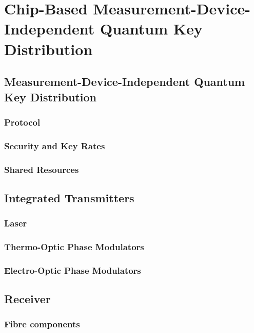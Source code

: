 %
%
\let\textcircled=\pgftextcircled
\chapter{Chip-Based Measurement-Device-Independent Quantum Key Distribution}
\label{chap:mdiqkd}

\section{Measurement-Device-Independent Quantum Key Distribution}
\label{sec:mdi-qkd}

\subsection{Protocol}

\subsection{Security and Key Rates}

\subsection{Shared Resources}

\section{Integrated Transmitters}

\subsection{Laser}

\subsection{Thermo-Optic Phase Modulators}

\subsection{Electro-Optic Phase Modulators}

\section{Receiver}

\subsection{Fibre components}

